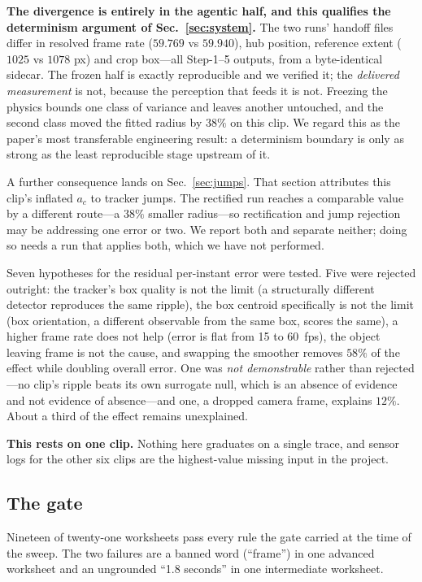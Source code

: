 \documentclass[conference]{IEEEtran}
\newcommand{\ac}{a_{c}}
\begin{document}
\textbf{The divergence is entirely in the agentic half, and this qualifies the
determinism argument of Sec.~\ref{sec:system}.} The two runs' handoff files
differ in resolved frame rate ($59.769$ vs $59.940$), hub position, reference
extent ($1025$ vs $1078$ px) and crop box---all Step-1--5 outputs, from a
byte-identical sidecar. The frozen half is exactly reproducible and we verified
it; the \emph{delivered measurement} is not, because the perception that feeds
it is not. Freezing the physics bounds one class of variance and leaves another
untouched, and the second class moved the fitted radius by $38\%$ on this clip.
We regard this as the paper's most transferable engineering result: a
determinism boundary is only as strong as the least reproducible stage upstream
of it.

A further consequence lands on Sec.~\ref{sec:jumps}. That section attributes
this clip's inflated $\ac$ to tracker jumps. The rectified run reaches a
comparable value by a different route---a $38\%$ smaller radius---so
rectification and jump rejection may be addressing one error or two. We report
both and separate neither; doing so needs a run that applies both, which we
have not performed.

Seven hypotheses for the residual per-instant error were tested. Five were
rejected outright: the tracker's box quality is not the limit (a structurally
different detector reproduces the same ripple), the box centroid specifically
is not the limit (box orientation, a different observable from the same box,
scores the same), a higher frame rate does not help (error is flat from 15 to
60~fps), the object leaving frame is not the cause, and swapping the smoother
removes $58\%$ of the effect while doubling overall error. One was
\emph{not demonstrable} rather than rejected---no clip's ripple beats its own
surrogate null, which is an absence of evidence and not evidence of
absence---and one, a dropped camera frame, explains $12\%$. About a third of
the effect remains unexplained.

\textbf{This rests on one clip.} Nothing here graduates on a single trace, and
sensor logs for the other six clips are the highest-value missing input in the
project.

\subsection{The gate}

Nineteen of twenty-one worksheets pass every rule the gate carried at the time
of the sweep. The two failures are a banned word (``frame'') in one advanced
worksheet and an ungrounded ``1.8 seconds'' in one intermediate worksheet.
\end{document}
